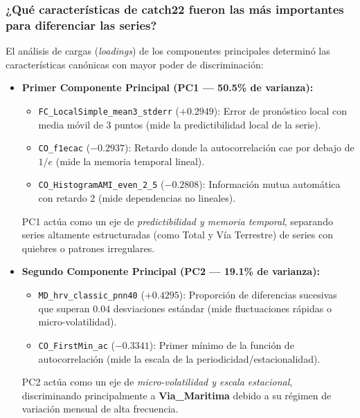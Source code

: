 \documentclass[11pt, a4paper]{article}
\begin{document}
\subsubsection{¿Qué características de catch22 fueron las más importantes para diferenciar las series?}
El análisis de cargas (\textit{loadings}) de los componentes principales determinó las características canónicas con mayor poder de discriminación:
\begin{itemize}
    \item \textbf{Primer Componente Principal (PC1 --- 50.5\% de varianza):}
    \begin{itemize}
        \item \texttt{FC\_LocalSimple\_mean3\_stderr} ($+0.2949$): Error de pronóstico local con media móvil de 3 puntos (mide la predictibilidad local de la serie).
        \item \texttt{CO\_f1ecac} ($-0.2937$): Retardo donde la autocorrelación cae por debajo de $1/e$ (mide la memoria temporal lineal).
        \item \texttt{CO\_HistogramAMI\_even\_2\_5} ($-0.2808$): Información mutua automática con retardo 2 (mide dependencias no lineales).
    \end{itemize}
    PC1 actúa como un eje de \emph{predictibilidad y memoria temporal}, separando series altamente estructuradas (como Total y Vía Terrestre) de series con quiebres o patrones irregulares.

    \item \textbf{Segundo Componente Principal (PC2 --- 19.1\% de varianza):}
    \begin{itemize}
        \item \texttt{MD\_hrv\_classic\_pnn40} ($+0.4295$): Proporción de diferencias sucesivas que superan $0.04$ desviaciones estándar (mide fluctuaciones rápidas o micro-volatilidad).
        \item \texttt{CO\_FirstMin\_ac} ($-0.3341$): Primer mínimo de la función de autocorrelación (mide la escala de la periodicidad/estacionalidad).
    \end{itemize}
    PC2 actúa como un eje de \emph{micro-volatilidad y escala estacional}, discriminando principalmente a \textbf{Via\_Maritima} debido a su régimen de variación mensual de alta frecuencia.
\end{itemize}
\end{document}
